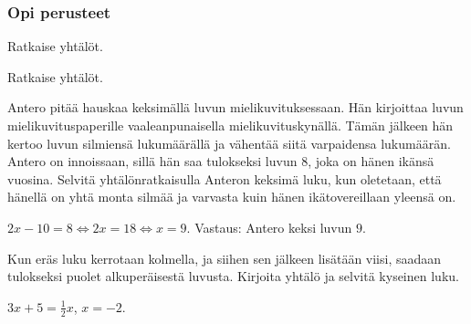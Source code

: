 \begin{tehtavasivu}

\subsubsection*{Opi perusteet}

\begin{tehtava}
    Ratkaise yhtälöt.
    \begin{vastaus}
    \end{vastaus}
\end{tehtava}

\begin{tehtava}
    Ratkaise yhtälöt.
    \begin{vastaus}
    \end{vastaus}
\end{tehtava}

\begin{tehtava}
    Antero pitää hauskaa keksimällä luvun mielikuvituksessaan. Hän kirjoittaa luvun mielikuvituspaperille vaaleanpunaisella mielikuvituskynällä. Tämän jälkeen hän kertoo luvun silmiensä lukumäärällä ja vähentää siitä varpaidensa lukumäärän. Antero on innoissaan, sillä hän saa tulokseksi luvun $8$, joka on hänen ikänsä vuosina. Selvitä yhtälönratkaisulla Anteron keksimä luku, kun oletetaan, että hänellä on yhtä monta silmää ja varvasta kuin hänen ikätovereillaan yleensä on.
    \begin{vastaus}
        $2x-10=8 \Leftrightarrow 2x=18 \Leftrightarrow x=9$. Vastaus: Antero keksi luvun $9$.
    \end{vastaus}
\end{tehtava}

\begin{tehtava}
    Kun eräs luku kerrotaan kolmella, ja siihen sen jälkeen lisätään viisi, saadaan tulokseksi puolet alkuperäisestä luvusta. Kirjoita yhtälö ja selvitä kyseinen luku.
    \begin{vastaus}
        $3x+5=\frac12x$, $x=-2$.
    \end{vastaus}
\end{tehtava}


\end{tehtavasivu}
